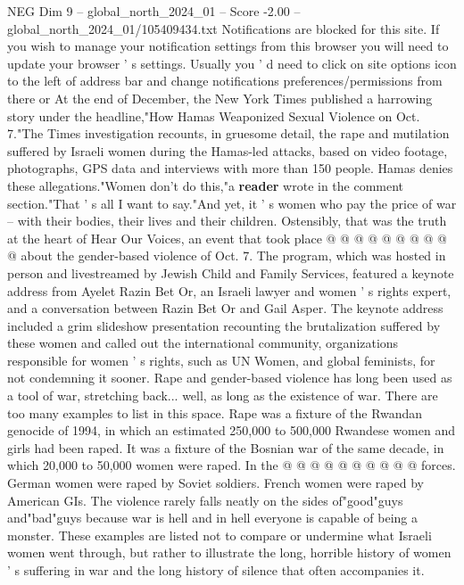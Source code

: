 \begin{textsample}{NEG Dim 9 – global\_north\_2024\_01 – Score -2.00 – global\_north\_2024\_01/105409434.txt}  \label{ex:f9_neg_192}
Notifications are blocked for this site.
If you wish to manage your notification settings from this browser you will need to update your browser ' s settings.
Usually you ' d need to click on site options icon to the left of address bar and change notifications preferences/permissions from there or At the end of December, the New York Times published a harrowing story under the headline,"How Hamas Weaponized Sexual Violence on Oct. 7."The Times investigation recounts, in gruesome detail, the rape and mutilation suffered by Israeli women during the Hamas-led attacks, based on video footage, photographs, GPS data and interviews with more than 150 people.
Hamas denies these allegations."Women don't do this,"a \textbf{reader} wrote in the comment section."That ' s all I want to say."And yet, it ' s women who pay the price of war -- with their bodies, their lives and their children.
Ostensibly, that was the truth at the heart of Hear Our Voices, an event that took place @ @ @ @ @ @ @ @ @ @ about the gender-based violence of Oct. 7.
The program, which was hosted in person and livestreamed by Jewish Child and Family Services, featured a keynote address from Ayelet Razin Bet Or, an Israeli lawyer and women ' s rights expert, and a conversation between Razin Bet Or and Gail Asper.
The keynote address included a grim slideshow presentation recounting the brutalization suffered by these women and called out the international community, organizations responsible for women ' s rights, such as UN Women, and global feminists, for not condemning it sooner.
Rape and gender-based violence has long been used as a tool of war, stretching back... well, as long as the existence of war.
There are too many examples to list in this space.
Rape was a fixture of the Rwandan genocide of 1994, in which an estimated 250,000 to 500,000 Rwandese women and girls had been raped.
It was a fixture of the Bosnian war of the same decade, in which 20,000 to 50,000 women were raped.
In the @ @ @ @ @ @ @ @ @ @ forces.
German women were raped by Soviet soldiers.
French women were raped by American GIs.
The violence rarely falls neatly on the sides of"good"guys and"bad"guys because war is hell and in hell everyone is capable of being a monster.
These examples are listed not to compare or undermine what Israeli women went through, but rather to illustrate the long, horrible history of women ' s suffering in war and the long history of silence that often accompanies it.

\end{textsample}
